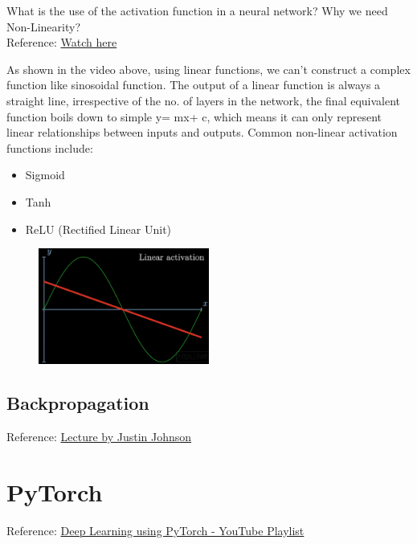 \documentclass[12pt, a4paper]{article}
\begin{document}
What is the use of the activation function in a neural network? Why we need Non-Linearity?\\
Reference: \href{https://youtu.be/gmjzbpSVY1A?si=zNG1e_BFRNVhcYxt&t=370}{Watch here}

\vspace{0.5em}

As shown in the video above, using linear functions, we can't construct a complex function like sinosoidal function. The output of a linear function is always a straight line, irrespective of the no. of layers in the network, the final equivalent function boils down to simple y= mx+ c, which means it can only represent linear relationships between inputs and outputs. 
Common non-linear activation functions include:
\begin{itemize}[nosep]
    \item Sigmoid
    \item Tanh
    \item ReLU (Rectified Linear Unit)
\end{itemize}

\begin{figure}[h]   %
    \centering
    \includegraphics[width=0.5\textwidth]{Linear Activation.png} %
    \label{fig:veri1}
\end{figure}

\subsection{Backpropagation}

Reference: \href{https://youtu.be/dB-u77Y5a6A?si=pFKasZnTR1_GaS5v}{Lecture by Justin Johnson}

\section{PyTorch}

Reference: \href{https://youtube.com/playlist?list=PLKnIA16_Rmvboy8bmDCjwNHgTaYH2puK7&si=q46c4wbwDzqZEilV}{Deep Learning using PyTorch - YouTube Playlist} 
\end{document}
